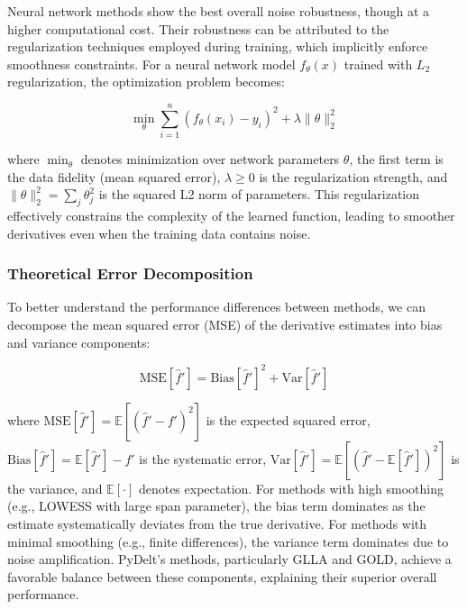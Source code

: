 \documentclass[10pt,journal,compsoc]{IEEEtran}
\begin{document}
Neural network methods show the best overall noise robustness, though at a higher computational cost. Their robustness can be attributed to the regularization techniques employed during training, which implicitly enforce smoothness constraints. For a neural network model $f_{\theta}(x)$ trained with $L_2$ regularization, the optimization problem becomes:

\begin{equation}
    \min_{\theta} \sum_{i=1}^{n} \left(f_{\theta}(x_i) - y_i\right)^2 + \lambda \|\theta\|_2^2
\end{equation}

where $\min_{\theta}$ denotes minimization over network parameters $\theta$, the first term is the data fidelity (mean squared error), $\lambda \geq 0$ is the regularization strength, and $\|\theta\|_2^2 = \sum_j \theta_j^2$ is the squared L2 norm of parameters. This regularization effectively constrains the complexity of the learned function, leading to smoother derivatives even when the training data contains noise.

\subsubsection{Theoretical Error Decomposition}

To better understand the performance differences between methods, we can decompose the mean squared error (MSE) of the derivative estimates into bias and variance components:

\begin{equation}
    \text{MSE}[\hat{f}'] = \text{Bias}[\hat{f}']^2 + \text{Var}[\hat{f}']
\end{equation}

where $\text{MSE}[\hat{f}'] = \mathbb{E}[(\hat{f}' - f')^2]$ is the expected squared error, $\text{Bias}[\hat{f}'] = \mathbb{E}[\hat{f}'] - f'$ is the systematic error, $\text{Var}[\hat{f}'] = \mathbb{E}[(\hat{f}' - \mathbb{E}[\hat{f}'])^2]$ is the variance, and $\mathbb{E}[\cdot]$ denotes expectation. For methods with high smoothing (e.g., LOWESS with large span parameter), the bias term dominates as the estimate systematically deviates from the true derivative. For methods with minimal smoothing (e.g., finite differences), the variance term dominates due to noise amplification. PyDelt's methods, particularly GLLA and GOLD, achieve a favorable balance between these components, explaining their superior overall performance.
\end{document}
